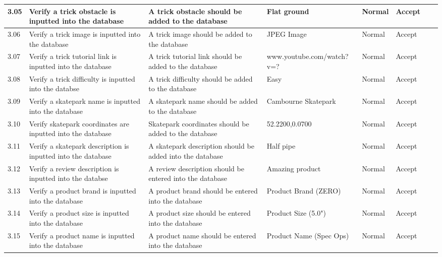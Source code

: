 \begin{landscape}
\begin{center}
\begin{longtable}{|p{1.5cm}|p{2.5cm}|p{2.5cm}|p{2cm}|p{2cm}|p{2cm}|p{2cm}|p{2cm}|}
3.05  & Verify a trick obstacle is inputted into the database & A trick obstacle should be added to the database & Flat ground & Normal & Accept & & \\ \hline

3.06 & Verify a trick image is inputted into the database & A trick image should be added to the database & JPEG Image & Normal & Accept & & \\ \hline

3.07 & Verify a trick tutorial link is inputted into the database & A trick tutorial link should be added to the database & www.youtube.com/watch?v=? & Normal & Accept & & \\ \hline

3.08 & Verify a trick difficulty is inputted into the databse & A trick difficulty should be added to the database & Easy & Normal & Accept & & \\ \hline

3.09 & Verify a skatepark name is inputted into the database & A skatepark name should be added to the database & Cambourne Skatepark & Normal & Accept & & \\ \hline

3.10 & Verify skatepark coordinates are inputted into the database & Skatepark coordinates should be added to the database & 52.2200,0.0700 & Normal & Accept & & \\ \hline

3.11 & Verify a skatepark description is inputted into the database & A skatepark description should be added into the database & Half pipe & Normal & Accept & & \\ \hline

3.12 & Verify a review description is inputted into the databse & A review description should be entered into the database & Amazing product & Normal & Accept & & \\ \hline
 
3.13 & Verify a product brand is inputted into the database & A product brand should be entered into the database & Product Brand (ZERO) & Normal & Accept & & \\ \hline

3.14 & Verify a product size is inputted into the database & A product size should be entered into the database & Product Size (5.0") & Normal & Accept && \\ \hline

3.15 & Verify a product name is inputted into the database & A product name should be entered into the database & Product Name (Spec Ops) & Normal & Accept & & \\ \hline


\end{longtable}
\end{center}
\end{landscape}
